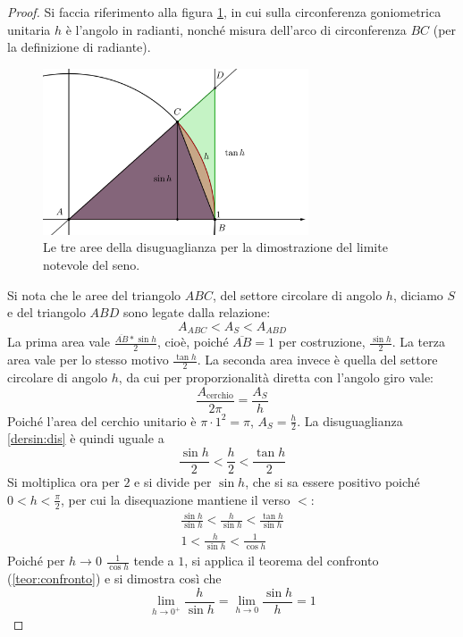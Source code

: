 \begin{proof}
	Si faccia riferimento alla figura \ref{fig:dersin}, in cui sulla circonferenza goniometrica unitaria $h$ è l'angolo in radianti, nonché misura dell'arco di circonferenza $BC$ (per la definizione di radiante).
	\begin{figure}[ht]
		\centering
		\includegraphics[width=0.7\textwidth]{grafici/sin_notevole}
		\caption{Le tre aree della disuguaglianza per la dimostrazione del limite notevole del seno.}
		\label{fig:dersin}
	\end{figure}
	Si nota che le aree del triangolo $ABC$, del settore circolare di angolo $h$, diciamo $S$ e del triangolo $ABD$ sono legate dalla relazione:
	\begin{equation}
		\label{dersin:dis}
		A_{ABC}<A_S<A_{ABD}
	\end{equation}
	La prima area vale $\frac{\overline{AB}*\sin h}{2}$, cioè, poiché $\overline{AB}=1$ per costruzione, $\frac{\sin h}{2}$. La terza area vale per lo stesso motivo $\frac{\tan h}{2}$. La seconda area invece è quella del settore circolare di angolo $h$, da cui per proporzionalità diretta con l'angolo giro vale:
	\[
		\frac{A_{\text{cerchio}}}{2\pi}=\frac{A_S}{h}
	\]
	Poiché l'area del cerchio unitario è $\pi\cdot 1^2=\pi$, $A_S=\frac{h}{2}$. La disuguaglianza \ref{dersin:dis} è quindi uguale a
	\[
		\frac{\sin h}{2}<\frac{h}{2}<\frac{\tan h}{2}
	\]
	Si moltiplica ora per $2$ e si divide per $\sin h$, che si sa essere positivo poiché $0<h<\frac{\pi}{2}$, per cui la disequazione mantiene il verso $<$:
	\begin{gather*}
		\frac{\sin h}{\sin h}<\frac{h}{\sin h}<\frac{\tan h}{\sin h}\\
		1<\frac{h}{\sin h}<\frac{1}{\cos h}
	\end{gather*}
	Poiché per $h\to0$ $\frac{1}{\cos h}$ tende a $1$, si applica il teorema del confronto (\vref{teor:confronto}) e si dimostra così che
	\[
		\lim_{h\to0^+} \frac{h}{\sin h}=\lim_{h\to0} \frac{\sin h}{h}=1
	\]
\end{proof}

